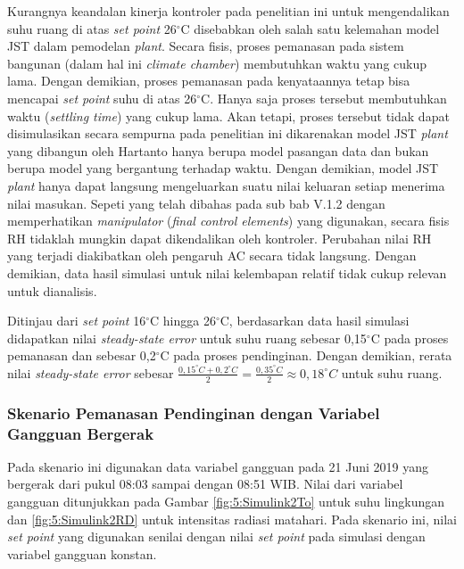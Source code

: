 \documentclass[a4paper,10pt]{article}
\newenvironment{body}{\begin{multicols}{2}}{\end{multicols}}
\begin{document}
\begin{body}
		Kurangnya keandalan kinerja kontroler pada penelitian ini untuk mengendalikan suhu ruang di atas \textit{set point} 26$^\circ$C disebabkan oleh salah satu kelemahan model JST dalam pemodelan \textit{plant}. Secara fisis, proses pemanasan pada sistem bangunan (dalam hal ini \textit{climate chamber}) membutuhkan waktu yang cukup lama. Dengan demikian, proses pemanasan pada kenyataannya tetap bisa mencapai \textit{set point} suhu di atas 26$^\circ$C. Hanya saja proses tersebut membutuhkan waktu (\textit{settling time}) yang cukup lama. Akan tetapi, proses tersebut tidak dapat disimulasikan secara sempurna pada penelitian ini dikarenakan model JST \textit{plant} yang dibangun oleh Hartanto\cite{skripsiTanto} hanya berupa model pasangan data dan bukan berupa model yang bergantung terhadap waktu. Dengan demikian, model JST \textit{plant} hanya dapat langsung mengeluarkan suatu nilai keluaran setiap menerima nilai masukan. Sepeti yang telah dibahas pada sub bab V.1.2 dengan memperhatikan \textit{manipulator} (\textit{final control elements}) yang digunakan, secara fisis RH tidaklah mungkin dapat dikendalikan oleh kontroler. Perubahan nilai RH yang terjadi diakibatkan oleh pengaruh AC secara tidak langsung. Dengan demikian, data hasil simulasi untuk nilai kelembapan relatif tidak cukup relevan untuk dianalisis.
		
		Ditinjau dari \textit{set point} 16$^\circ$C hingga 26$^\circ$C, berdasarkan data hasil simulasi didapatkan nilai \textit{steady-state error} untuk suhu ruang sebesar 0,15$^\circ$C pada proses pemanasan dan sebesar 0,2$^\circ$C pada proses pendinginan. Dengan demikian, rerata nilai \textit{steady-state error} sebesar $\frac{0,15^\circ C + 0,2^\circ C}{2} = \frac{0,35^\circ C}{2} \approx 0,18^\circ C$ untuk suhu ruang.\\
		
		\subsubsection{Skenario Pemanasan Pendinginan dengan Variabel Gangguan Bergerak}
		
		Pada skenario ini digunakan data variabel gangguan pada 21 Juni 2019 yang bergerak dari pukul 08:03 sampai dengan 08:51 WIB. Nilai dari variabel gangguan ditunjukkan pada Gambar \ref{fig:5:Simulink2To} untuk suhu lingkungan dan \ref{fig:5:Simulink2RD} untuk intensitas radiasi matahari. Pada skenario ini, nilai \textit{set point} yang digunakan senilai dengan nilai \textit{set point} pada simulasi dengan variabel gangguan konstan.
		

\end{body}
\end{document}

